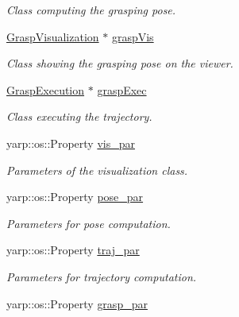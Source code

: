 \begin{DoxyCompactItemize}
\begin{DoxyCompactList}\small\item\em Class computing the grasping pose. \end{DoxyCompactList}\item 
\hyperlink{classGraspVisualization}{Grasp\+Visualization} $\ast$ \hyperlink{classGraspingModule_a98acb57493a68c3ce14f6e89b721aa23}{grasp\+Vis}\label{classGraspingModule_a98acb57493a68c3ce14f6e89b721aa23}

\begin{DoxyCompactList}\small\item\em Class showing the grasping pose on the viewer. \end{DoxyCompactList}\item 
\hyperlink{classGraspExecution}{Grasp\+Execution} $\ast$ \hyperlink{classGraspingModule_a1c5e0b94e7b086d14ac1bf45db3007f1}{grasp\+Exec}\label{classGraspingModule_a1c5e0b94e7b086d14ac1bf45db3007f1}

\begin{DoxyCompactList}\small\item\em Class executing the trajectory. \end{DoxyCompactList}\item 
yarp\+::os\+::\+Property \hyperlink{classGraspingModule_a2d8f2bb7d5263b2df89d7431fe830525}{vis\+\_\+par}\label{classGraspingModule_a2d8f2bb7d5263b2df89d7431fe830525}

\begin{DoxyCompactList}\small\item\em Parameters of the visualization class. \end{DoxyCompactList}\item 
yarp\+::os\+::\+Property \hyperlink{classGraspingModule_ac5132578e072a0cd851a888487d4e144}{pose\+\_\+par}\label{classGraspingModule_ac5132578e072a0cd851a888487d4e144}

\begin{DoxyCompactList}\small\item\em Parameters for pose computation. \end{DoxyCompactList}\item 
yarp\+::os\+::\+Property \hyperlink{classGraspingModule_a4fde085a2948717e65736a75a2786a0d}{traj\+\_\+par}\label{classGraspingModule_a4fde085a2948717e65736a75a2786a0d}

\begin{DoxyCompactList}\small\item\em Parameters for trajectory computation. \end{DoxyCompactList}\item 
yarp\+::os\+::\+Property \hyperlink{classGraspingModule_a8665afdacf9d155c465fb7497d202fba}{grasp\+\_\+par}\label{classGraspingModule_a8665afdacf9d155c465fb7497d202fba}


\end{DoxyCompactItemize}
